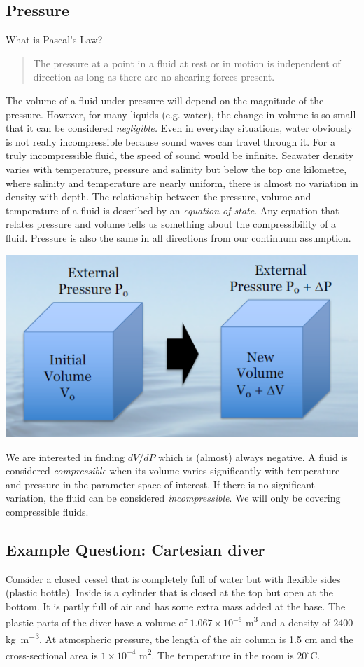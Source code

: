 \documentclass[class=report, crop=false, 12pt,a4paper]{standalone}
\begin{document}
\subsection{Pressure}
What is Pascal's Law?
\begin{quote}
  \begin{center}
    The pressure at a point in a fluid at rest or in motion is independent of direction as long as there are no shearing forces present.
  \end{center}
\end{quote}
The volume of a fluid under pressure will depend on the magnitude of the pressure. However, for many liquids (e.g. water), the change in volume is so small that it can be considered \emph{negligible.} Even in everyday situations, water obviously is not really incompressible because sound waves can travel through it. For a truly incompressible fluid, the speed of sound would be infinite. Seawater density varies with temperature, pressure and salinity but below the top one kilometre, where salinity and temperature are nearly uniform, there is almost no variation in density with depth. The relationship between the pressure, volume and temperature of a fluid is described by an \emph{equation of state}. Any equation that relates pressure and volume tells us something about the compressibility of a fluid. Pressure is also the same in all directions from our continuum assumption.
\begin{center}
  \includegraphics[width = 0.8 \textwidth]{../img/CompressibilityOfFluid}
\end{center}
We are interested in finding \( dV/dP\) which is (almost) always negative. A fluid is considered \emph{compressible} when its volume varies significantly with temperature and pressure in the parameter space of interest. If there is no significant variation, the fluid can be considered \emph{incompressible}. We will only be covering compressible fluids.

\subsection{Example Question: Cartesian diver}
Consider a closed vessel that is completely full of water but with flexible sides (plastic bottle). Inside is a cylinder that is closed at the top but open at the bottom. It is partly full of air and has some extra mass added at the base. The plastic parts of the diver have a volume of \(1.067\times 10^{-6} \) \si{\meter\cubed} and a density of \(2400\) \si{\kg\per\meter\cubed}. At atmospheric pressure, the length of the air column is 1.5 \si{\cm} and the cross-sectional area is \(1\times 10^{-4}\) \si{\meter\squared}. The temperature in the room is \(20^{\circ}\)C. 
\end{document}
